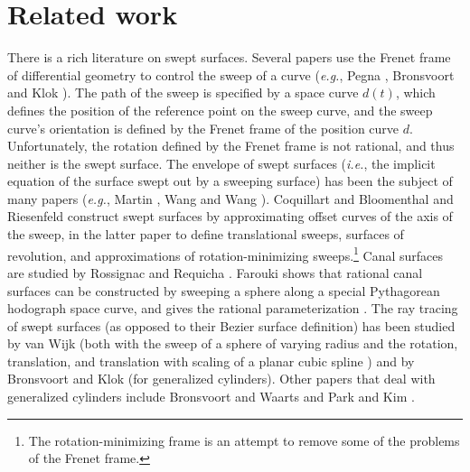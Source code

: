\documentclass[times]{article}
\begin{document}

\section{Related work}
\label{sec:related}

There is a rich literature on swept surfaces.
Several papers use the Frenet frame of differential geometry
to control the sweep of a curve ({\em e.g.}, Pegna \cite{Pegna88},
Bronsvoort and Klok \cite{bronsklok85}).
The path of the sweep is specified by a space curve $d(t)$,
which defines the position of the reference point on the
sweep curve, and the sweep curve's orientation is defined by
the Frenet frame of the position curve $d$.
Unfortunately, the rotation defined by the Frenet frame is not rational,
and thus neither is the swept surface.  %
The envelope of swept surfaces ({\em i.e.}, the implicit equation of the surface
swept out by a sweeping surface) has been the subject of many papers
({\em e.g.}, Martin \cite{martinsteph90}, Wang and Wang \cite{WangWang86}).
\nocite{Flaquer92}
Coquillart \cite{coquillart87} and Bloomenthal and Riesenfeld 
\cite{bloom91} construct swept surfaces by approximating offset curves
of the axis of the sweep, in the latter paper to define translational sweeps,
surfaces of revolution, and approximations of rotation-minimizing 
sweeps.\footnote{The rotation-minimizing frame 
        is an attempt to remove some of the problems of the Frenet frame.}
Canal surfaces are studied by Rossignac and Requicha 
\cite{rossrequicha84,rossignac85}.
Farouki shows that rational canal surfaces can be constructed by sweeping
a sphere along a special Pythagorean hodograph space curve, and gives the
rational parameterization \cite{farouki94}.
The ray tracing of swept surfaces (as opposed to their Bezier surface 
definition) has been studied by van Wijk (both with the sweep of a sphere
of varying radius \cite{vanwijk84euro} and the rotation, translation,
and translation with scaling of a planar cubic spline \cite{vanwijk84tog})
and by Bronsvoort and Klok \cite{bronsklok85} (for generalized cylinders).
Other papers that deal with generalized cylinders 
include Bronsvoort and Waarts \cite{bronswaart92} and Park and Kim 
\cite{parkkim93}.
\end{document}
